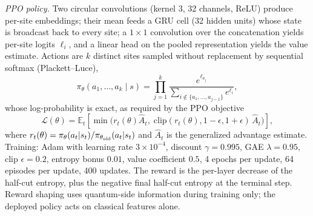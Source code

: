 \documentclass[aps,prb,twocolumn,superscriptaddress,nofootinbib]{revtex4-2}
\begin{document}
\emph{PPO policy.} Two circular convolutions (kernel 3, 32 channels,
ReLU) produce per-site embeddings; their mean feeds a GRU cell (32
hidden units) whose state is broadcast back to every site; a
$1\times 1$ convolution over the concatenation yields per-site logits
$\ell_i$, and a linear head on the pooled representation yields the
value estimate. Actions are $k$ distinct sites sampled without
replacement by sequential softmax (Plackett--Luce),
\begin{equation}
\pi_\theta(a_1, \ldots, a_k \mid s)
 = \prod_{j=1}^{k}
   \frac{e^{\ell_{a_j}}}
        {\sum_{i \notin \{a_1, \ldots, a_{j-1}\}} e^{\ell_i}},
\label{eq:pl}
\end{equation}
whose log-probability is exact, as required by the PPO objective
\begin{equation}
\mathcal{L}(\theta) = \mathbb{E}_t\!\left[
 \min\!\big(r_t(\theta) \hat A_t,\;
 \mathrm{clip}(r_t(\theta), 1{-}\epsilon, 1{+}\epsilon)\, \hat A_t\big)
\right],
\label{eq:ppo}
\end{equation}
where $r_t(\theta) = \pi_\theta(a_t|s_t)/\pi_{\theta_{\rm old}}(a_t|s_t)$
and $\hat A_t$ is the generalized advantage estimate. Training: Adam
with learning rate $3\times 10^{-4}$, discount $\gamma = 0.995$, GAE
$\lambda = 0.95$, clip $\epsilon = 0.2$, entropy bonus $0.01$, value
coefficient $0.5$, 4 epochs per update, 64 episodes per update, 400
updates. The reward is the per-layer decrease of the half-cut entropy,
plus the negative final half-cut entropy at the terminal step. Reward
shaping uses quantum-side information during training only; the deployed
policy acts on classical features alone.


\end{document}
